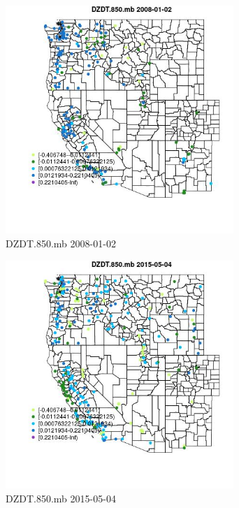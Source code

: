 \begin{figure} 
\centering  
\includegraphics[width=0.77\textwidth]{Code_Outputs/Report_ML_input_PM25_Step4_part_e_de_duplicated_aves_compiled_2019-05-18wNAs_MapObsDZDT850mb2008-01-02.jpg} 
\caption{\label{fig:Report_ML_input_PM25_Step4_part_e_de_duplicated_aves_compiled_2019-05-18wNAsMapObsDZDT850mb2008-01-02}DZDT.850.mb 2008-01-02} 
\end{figure} 
 

\begin{figure} 
\centering  
\includegraphics[width=0.77\textwidth]{Code_Outputs/Report_ML_input_PM25_Step4_part_e_de_duplicated_aves_compiled_2019-05-18wNAs_MapObsDZDT850mb2015-05-04.jpg} 
\caption{\label{fig:Report_ML_input_PM25_Step4_part_e_de_duplicated_aves_compiled_2019-05-18wNAsMapObsDZDT850mb2015-05-04}DZDT.850.mb 2015-05-04} 
\end{figure} 
 

